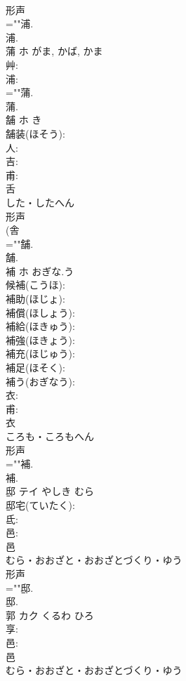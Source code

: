 \documentclass[8pt]{extreport}
\begin{document}
\begin{CJK}{UTF8}{min}
\\	形声 
\\	=""浦.
\\	浦.
\\	蒲	ホ	がま, かば, かま		
\\	艸: 
\\	浦: 
\\	=""蒲.
\\	蒲.
\\	舗	ホ		き	
\\	舗装(ほそう): 
\\	人: 
\\	吉: 
\\	甫: 
\\	舌	
\\	した・したへん	
\\	形声 
\\	(舎 
\\	=""舗.
\\	舗.
\\	補	ホ	おぎな.う		
\\	候補(こうほ): 
\\	補助(ほじょ): 
\\	補償(ほしょう): 
\\	補給(ほきゅう): 
\\	補強(ほきょう): 
\\	補充(ほじゅう): 
\\	補足(ほそく): 
\\	補う(おぎなう): 
\\	衣: 
\\	甫: 
\\	衣	
\\	ころも・ころもへん	
\\	形声 
\\	=""補.
\\	補.
\\	邸	テイ	やしき	むら	
\\	邸宅(ていたく): 
\\	氐: 
\\	邑: 
\\	邑	
\\	むら・おおざと・おおざとづくり・ゆう	
\\	形声 
\\	=""邸.
\\	邸.
\\	郭	カク	くるわ	ひろ	
\\	享: 
\\	邑: 
\\	邑	
\\	むら・おおざと・おおざとづくり・ゆう	

\end{CJK}
\end{document}
